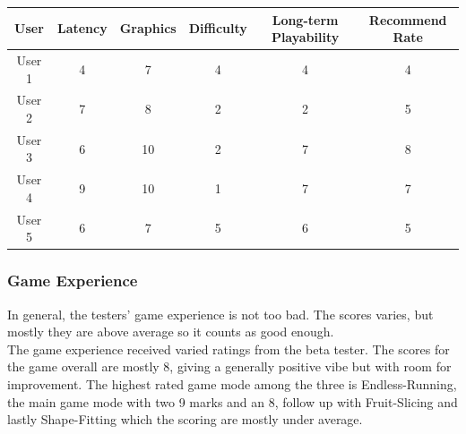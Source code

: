 \documentclass[12pt]{article}
\begin{document}
\begin{table}[]
    \center
    \begin{tabular}{|c|c|c|c|c|c|}
    \hline
    \rowcolor[HTML]{C0C0C0} 
    \textbf{User} & \textbf{Latency} & \textbf{Graphics} & \textbf{Difficulty} & \textbf{Long-term Playability} & \textbf{Recommend Rate} \\ \hline
    User 1        & 4                & 7                 & 4                   & 4                                                                        & 4                                                                 \\ \hline
    User 2        & 7                & 8                 & 2                   & 2                                                                        & 5                                                                 \\ \hline
    User 3        & 6                & 10                & 2                   & 7                                                                        & 8                                                                 \\ \hline
    User 4        & 9                & 10                & 1                   & 7                                                                        & 7                                                                 \\ \hline
    User 5        & 6                & 7                 & 5                   & 6                                                                        & 5                                                                 \\ \hline
    \end{tabular}
\end{table}

\subsubsection{Game Experience}
\hspace*{1.5em} In general, the testers' game experience is not too bad. The scores varies, but mostly they are above average so it counts as good enough.\\

The game experience received varied ratings from the beta tester. The scores for the game overall are mostly 8, giving a generally positive vibe but with room for improvement.
The highest rated game mode among the three is Endless-Running, the main game mode with two 9 marks and an 8, follow up with Fruit-Slicing and lastly Shape-Fitting which the scoring are mostly under average.\\
\end{document}
